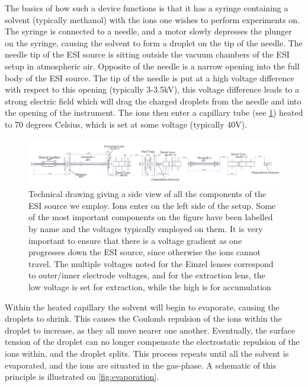 The basics of how such a device functions is that it has a syringe containing a solvent (typically methanol) with the ions one wishes to perform experiments on. The syringe is connected to a needle, and a motor slowly depresses the plunger on the syringe, causing the solvent to form a droplet on the tip of the needle. The needle tip of the ESI source is sitting outside the vacuum chambers of the ESI setup in atmospheric air.
Opposite of the needle is a narrow opening into the full body of the ESI source. The tip of the needle is put at a high voltage difference with respect to this opening (typically 3-3.5kV), this voltage difference leads to a strong electric field which will drag the charged droplets from the needle and into the opening of the instrument.
The ions then enter a capillary tube (see \cref{fig:esiDrawing}) heated to 70 degrees Celsius, which is set at some voltage (typically 40V).
\begin{figure}
    \centering
    \includegraphics[width = 1.1\textwidth]{main/electrospray_elements.pdf}
    \caption{Technical drawing giving a side view of all the components of the ESI source we employ. Ions enter on the left side of the setup. Some of the most important components on the figure have been labelled by name and the voltages typically employed on them.
    It is very important to ensure that there is a voltage gradient as one progresses down the ESI source, since otherwise the ions cannot travel. The multiple voltages noted for the Einzel lenses correspond to outer/inner electrode voltages, and for the extraction lens, the low voltage is set for extraction, while the high is for accumulation}
    \label{fig:esiDrawing}
\end{figure}
Within the heated capillary the solvent will begin to evaporate, causing the droplets to shrink. This causes the Coulomb repulsion of the ions within the droplet to increase, as they all move nearer one another.
Eventually, the surface tension of the droplet can no longer compensate the electrostatic repulsion of the ions within, and the droplet splits. This process repeats until all the solvent is evaporated, and the ions are situated in the gas-phase. A schematic of this principle is illustrated on \cref{fig:evaporation}.
